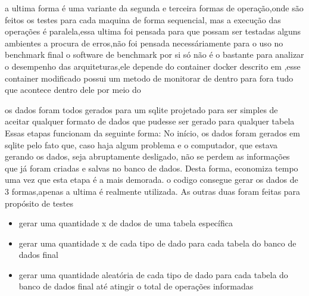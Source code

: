 \documentclass[
	12pt,				%
	openright,			%
	oneside,			%
	a4paper,			%
	english,			%
	french,				%
	spanish,			%
	brazil,				%
	]{abntex2}
\begin{document}
a ultima forma é uma variante da segunda e terceira formas de operação,onde são feitos os testes para cada maquina de forma sequencial, mas a execução das operações é paralela,essa ultima foi pensada para que possam ser testadas alguns ambientes a procura de erros,não foi pensada necessáriamente para o uso no benchmark final\newline
o software de benchmark por si só não é o bastante para analizar o desempenho das arquiteturas,ele depende do container docker descrito em ,esse container modificado possui um metodo de monitorar de dentro para fora tudo que acontece dentro dele por meio do  \newline


os dados foram todos gerados para um sqlite projetado para ser simples de aceitar qualquer formato de dados que pudesse ser gerado para qualquer tabela
Essas etapas funcionam da seguinte forma:\newline
No início, os dados foram gerados em sqlite pelo fato que, caso haja algum problema e o computador, que estava gerando os dados, seja abruptamente desligado, não se perdem as informações que já foram criadas e salvas no banco de dados. Desta forma, economiza tempo uma vez que esta etapa é a mais demorada.\newline
o codigo consegue gerar os dados de 3 formas,apenas a ultima é realmente utilizada.
As outras duas foram feitas para propósito de testes

\begin{itemize}
\item gerar uma quantidade x de dados de uma tabela específica
\item gerar uma quantidade x de cada tipo de dado para cada tabela do banco de dados final
\item gerar uma quantidade aleatória de cada tipo de dado para cada tabela do banco de dados final até atingir o total de operações informadas
\end{itemize}
\end{document}
